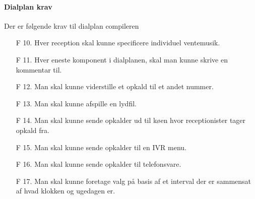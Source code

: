 \paragraph{Dialplan krav}
Der er følgende krav til dialplan compileren
\begin{enumerate}
  \item[F 10.] Hver reception skal kunne specificere individuel ventemusik.
  \item[F 11.] Hver eneste komponent i dialplanen, skal man kunne skrive en kommentar til.
  \item[F 12.] Man skal kunne viderstille et opkald til et andet nummer.
  \item[F 13.] Man skal kunne afspille en lydfil.
  \item[F 14.] Man skal kunne sende opkalder ud til køen hvor receptionister tager opkald fra.
  \item[F 15.] Man skal kunne sende opkalder til en IVR menu.
  \item[F 16.] Man skal kunne sende opkalder til telefonsvare.
  \item[F 17.] Man skal kunne foretage valg på basis af et interval der er sammensat af hvad klokken og ugedagen er.
\end{enumerate}

